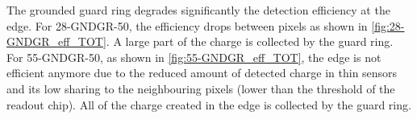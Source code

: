 The grounded guard ring degrades significantly the detection
efficiency at the edge. For 28-GNDGR-50, the efficiency drops between
pixels as shown in \cref{fig:28-GNDGR_eff_TOT}. A large part of the
charge is collected by the guard ring. For 55-GNDGR-50, as shown in
\cref{fig:55-GNDGR_eff_TOT}, the edge is not efficient anymore due to
the reduced amount of detected charge in thin sensors and its low
sharing to the neighbouring pixels (lower than the threshold of the
readout chip). All of the charge created in the edge is collected by
the guard ring.

\begin{figure}[htbp]
  \begin{subfigure}[b]{0.5\textwidth}
    \centering
    \caption{}
  \end{subfigure}~
  \begin{subfigure}[b]{0.5\textwidth}
    \centering
\end{subfigure}
\end{figure}
